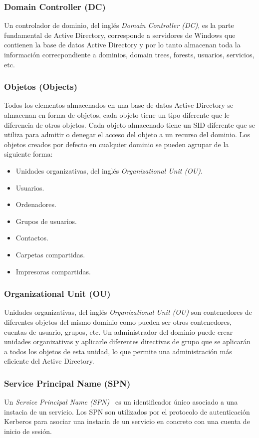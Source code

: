 \subsubsection{Domain Controller (DC)}

Un controlador de dominio, del inglés {\it Domain Controller (DC)}, es la parte fundamental de Active Directory, corresponde a servidores de Windows que contienen la base de datos Active Directory y por lo tanto almacenan toda la información correcpondiente a dominios, domain trees, forests, usuarios, servicios, etc. 

\subsubsection{Objetos (Objects)}

Todos los elementos almacenados en una base de datos Active Directory se almacenan en forma de objetos, cada objeto tiene un tipo diferente que le diferencia de otros objetos. Cada objeto almacenado tiene un SID diferente que se utiliza para admitir o denegar el acceso del objeto a un recurso del dominio. Los objetos creados por defecto en cualquier dominio se pueden agrupar de la siguiente forma: 

\begin{itemize}
\item Unidades organizativas, del inglés {\it Organizational Unit (OU)}. 
\item Usuarios.
\item Ordenadores. 
\item Grupos de usuarios.
\item Contactos.
\item Carpetas compartidas. 
\item Impresoras compartidas.
\end{itemize}

\subsubsection{Organizational Unit (OU)}

Unidades organizativas, del inglés {\it Organizational Unit (OU)} son contenedores de diferentes objetos del mismo dominio como pueden ser otros contenedores, cuentas de usuario, grupos, etc. Un administrador del dominio puede crear unidades organizativas y aplicarle diferentes directivas de grupo que se aplicarán a todos los objetos de esta unidad, lo que permite una administración más eficiente del Active Directory. 

\subsubsection{Service Principal Name (SPN)}

Un {\it Service Principal Name (SPN)}~\cite{Capitulo4:SPN} es un identificador único asociado a una instacia de un servicio. Los SPN son utilizados por el protocolo de autenticación Kerberos para asociar una instacia de un servicio en concreto con una cuenta de inicio de sesión.  

